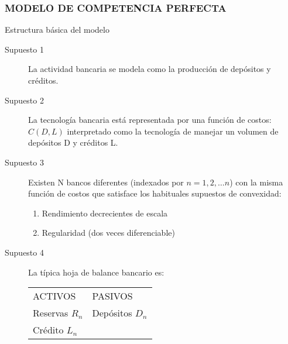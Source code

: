 \begin{frame}
    \frametitle{{\normalsize MODELO DE COMPETENCIA PERFECTA} {}}
    \setcounter{equation}{0}
    \begin{block} {Estructura básica del modelo}
        \begin{description}
            \item[Supuesto 1]  La actividad bancaria se modela como la producción de depósitos y créditos.
            \item[Supuesto 2] La tecnología bancaria está representada por una función de costos: $C(D,L)$ interpretado como la tecnología de manejar un volumen de depósitos D y créditos L.
            \item[Supuesto 3] Existen N bancos diferentes (indexados por $n=1, 2, \ldots n$) con la misma función de costos que satisface los habituales supuestos de convexidad:
            \begin{enumerate}
                \item Rendimiento decrecientes de escala 
                \item Regularidad (dos veces diferenciable)
            \end{enumerate}
            \item[Supuesto 4] La típica hoja de balance bancario es:
              \begin{table}[htbp]
            \centering
             \begin{tabular}{ll}
                ACTIVOS & PASIVOS \\
                Reservas $R_{n}$ & Depósitos $D_{n}$ \\
                Crédito  $L_{n}$ &  \\
            \end{tabular}%
            \end{table}%
            
                 
        \end{description}
        
    \end{block}	
    
\end{frame}


